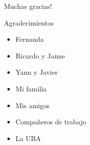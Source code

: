\begin{frame}{}
 \begin{alertblock}{}
  \centering
  \huge{
  Muchas gracias!
  }
 \end{alertblock}
\end{frame}

\begin{frame}{Agradecimientos}
 \begin{alertblock}{}
  \begin{itemize}
   \item Fernanda
   \item Ricardo y Jaime
   \item Yann y Javier
   \item Mi familia
   \item Mis amigos
   \item Compa\~neros de trabajo
   \item La UBA
  \end{itemize}

 \end{alertblock}
\end{frame}
